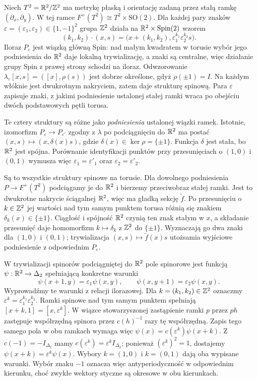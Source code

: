 \begin{przyklad}
\label{prz:spin-torus}
Niech $T^2=\mathbb{R}^2/\mathbb{Z}^2$ ma metrykę płaską i orientację
zadaną przez stałą ramkę $(\partial_x,\partial_y)$.
W tej ramce $F^+(T^2)\cong T^2\times\mathrm{SO}(2)$.
Dla każdej pary znaków
$\varepsilon=(\varepsilon_1,\varepsilon_2)\in\{1,-1\}^2$
grupa $\mathbb{Z}^2$ działa na $\mathbb{R}^2\times\operatorname{Spin}(2)$ wzorem
\[
 (k_1,k_2)\cdot(x,s)
  =\bigl(x+(k_1,k_2),
          \varepsilon_1^{k_1}\varepsilon_2^{k_2}s\bigr).
\]
Iloraz $P_\varepsilon$ jest wiązką główną Spin:
nad małym kwadratem w torusie wybór jego podniesienia do $\mathbb{R}^2$
daje lokalną trywializację, a znaki są centralne,
więc działanie grupy Spin z prawej strony schodzi na iloraz.
Odwzorowanie
$\lambda_\varepsilon[x,s]=([x],\rho(s))$
jest dobrze określone, gdyż $\rho(\pm1)=I$.
Na każdym włóknie jest dwukrotnym nakryciem, zatem daje
strukturę spinową. Para $\varepsilon$ zapisuje znaki,
z jakimi podniesienie ustalonej stałej ramki wraca
po obejściu dwóch podstawowych pętli torusa.

Te cztery struktury są różne jako \emph{podniesienia}
ustalonej wiązki ramek. Istotnie, izomorfizm
$P_\varepsilon\to P_{\varepsilon'}$ zgodny z $\lambda$
po podciągnięciu do $\mathbb{R}^2$ ma postać
$(x,s)\mapsto(x,\delta(x)s)$, gdzie
$\delta(x)\in\ker\rho=\{\pm1\}$.
Funkcja $\delta$ jest stała, bo $\mathbb{R}^2$ jest spójna.
Porównanie identyfikacji punktów przy przesunięciach
o $(1,0)$ i $(0,1)$ wymusza więc
$\varepsilon_1=\varepsilon'_1$ oraz
$\varepsilon_2=\varepsilon'_2$.

Są to wszystkie struktury spinowe na torusie. Dla dowolnego
podniesienia $P\to F^+(T^2)$ podciągamy je do $\mathbb{R}^2$ i bierzemy
przeciwobraz stałej ramki. Jest to dwukrotne nakrycie
ściągalnej $\mathbb{R}^2$, więc ma gładką sekcję $\widetilde f$.
Po przesunięciu o $k\in\mathbb{Z}^2$ jej wartości nad tym samym
punktem torusa różnią się znakiem $\delta_k(x)\in\{\pm1\}$.
Ciągłość i spójność $\mathbb{R}^2$ czynią ten znak stałym w $x$,
a składanie przesunięć daje homomorfizm
$k\mapsto\delta_k$ z $\mathbb{Z}^2$ do $\{\pm1\}$.
Wyznaczają go dwa znaki dla $(1,0)$ i $(0,1)$;
trywializacja $(x,s)\mapsto\widetilde f(x)s$ utożsamia
wyjściowe podniesienie z odpowiednim $P_\varepsilon$.

W trywializacji spinorów podciągniętej do $\mathbb{R}^2$
pole spinorowe jest funkcją $\psi:\mathbb{R}^2\to\Delta_2$
spełniającą konkretne warunki
\[
 \psi(x+1,y)=\varepsilon_1\psi(x,y),
 \qquad
 \psi(x,y+1)=\varepsilon_2\psi(x,y).
\]
Wyprowadźmy te warunki z relacji ilorazowej.
Dla $k=(k_1,k_2)\in\mathbb{Z}^2$ oznaczmy
$\varepsilon^k=\varepsilon_1^{k_1}\varepsilon_2^{k_2}$.
Ramki spinowe nad tym samym punktem spełniają
$[x+k,1]=[x,\varepsilon^k]$.
W wiązce stowarzyszonej zastąpienie ramki $p$ przez $p h$
zastępuje współrzędną spinora przez $c(h)^{-1}$ razy tę współrzędną.
Zapis tego samego pola w obu ramkach wymaga więc
$\psi(x)=c(\varepsilon^k)\psi(x+k)$.
Z $c(-1)=-I_{\Delta_2}$ mamy
$c(\varepsilon^k)=\varepsilon^k I_{\Delta_2}$;
ponieważ $(\varepsilon^k)^2=1$, dostajemy
$\psi(x+k)=\varepsilon^k\psi(x)$.
Wybory $k=(1,0)$ i $k=(0,1)$ dają oba wypisane warunki.
Wybór znaku $-1$ oznacza więc antyperiodyczność
w odpowiednim kierunku, choć zwykłe wektory styczne
są okresowe w obu kierunkach.
\end{przyklad}


